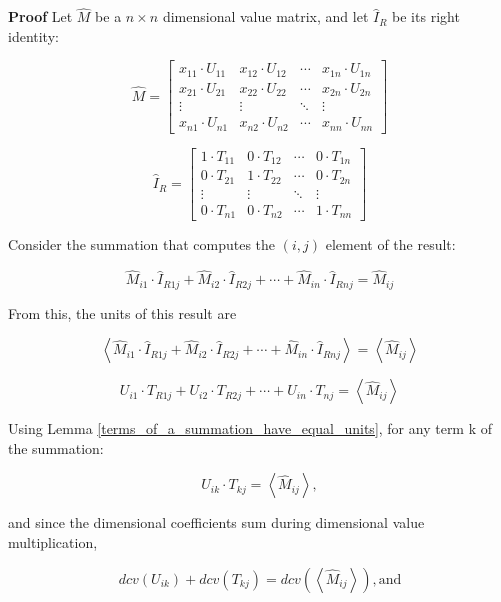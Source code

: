 \documentclass[10pt,letterpaper]{article}
\newenvironment{proof}{\noindent\textbf{Proof} }{\qed \newline}
\newcommand{\qed}{\nobreak \ifvmode \relax \else
      \ifdim\lastskip<1.5em \hskip-\lastskip
      \hskip1.5em plus0em minus0.5em \fi \nobreak
      \vrule height0.75em width0.5em depth0.25em\fi}
\numberwithin{equation}{section}
\begin{document}
\begin{proof}Let $\hat M$ be a $n \times n$ dimensional value matrix, and let $\hat I_R$ be its right identity:

\[ \hat M = \left[ \begin{matrix} 
  x_{11} \cdot U_{11} & x_{12} \cdot U_{12} & \cdots & x_{1n} \cdot U_{1n} \\
  x_{21} \cdot U_{21} & x_{22} \cdot U_{22} & \cdots & x_{2n} \cdot U_{2n} \\
  \vdots & \vdots & \ddots & \vdots \\
  x_{n1} \cdot U_{n1} & x_{n2} \cdot U_{n2} & \cdots & x_{nn} \cdot U_{nn}
 \end{matrix} \right] \]

\[ \hat I_R = \left[ \begin{matrix} 
  1 \cdot T_{11} & 0 \cdot T_{12} & \cdots & 0 \cdot T_{1n} \\
  0 \cdot T_{21} & 1 \cdot T_{22} & \cdots & 0 \cdot T_{2n} \\
  \vdots & \vdots & \ddots & \vdots \\
  0 \cdot T_{n1} & 0 \cdot T_{n2} & \cdots & 1 \cdot T_{nn}
 \end{matrix} \right] \]

Consider the summation that computes the $(i, j)$ element of the result:

\[ \hat M_{i1} \cdot \hat I_{R1j} + \hat M_{i2} \cdot \hat I_{R2j} +\cdots + \hat M_{in} \cdot \hat I_{Rnj} = \hat M_{ij} \]

From this, the units of this result are

\[ \left\langle \hat M_{i1} \cdot \hat I_{R1j} + \hat M_{i2} \cdot \hat I_{R2j} +\cdots + \hat M_{in} \cdot \hat I_{Rnj} \right\rangle = \left\langle \hat M_{ij} \right\rangle \]

\[ U_{i1} \cdot T_{R1j} + U_{i2} \cdot T_{R2j} +\cdots + U_{in} \cdot T_{nj} = \left\langle \hat M_{ij} \right\rangle \]

Using Lemma \ref{terms_of_a_summation_have_equal_units}, for any term k of the summation:

\[ U_{ik} \cdot T_{kj} = \left\langle \hat M_{ij} \right\rangle , \]

and since the dimensional coefficients sum during dimensional value multiplication,

\begin{equation} \label{basic_equation_1_for_right_identity_ddv_proof} 
dcv(U_{ik}) + dcv(T_{kj}) = dcv( \left\langle \hat M_{ij} \right\rangle ) , \mbox{and} \end{equation}


\end{proof}
\end{document}
